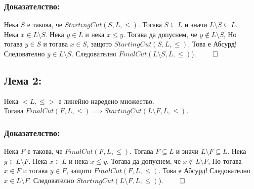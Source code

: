 \documentclass[12pt]{article}
\begin{document}
\subsubsection*{Доказателство:}
Нека \(S\) е такова, че \(StartingCut(S, L, \leq)\).
Тогава \(S \subseteq L\) и значи \(L \setminus S \subseteq L\).
Нека \(x \in L \setminus S\). Нека \(y \in L\) и нека \(x \leq y\).
Тогава да допуснем, че \(y \notin L \setminus S\),
Но тогава \(y \in S\) и тогава \(x \in S\), защото \(StartingCut(S, L, \leq)\).
Това е Абсурд! Следователно \(y \in L \setminus S\).
Следователно \(FinalCut(L \setminus S, L, \leq)\)). \(\qed\)

\subsection*{Лема 2:}
Нека \(<L, \leq>\) е линейно наредено множество.
\\
Тогава \(FinalCut(F, L, \leq) \implies StartingCut(L \setminus F, L, \leq)\).

\subsubsection*{Доказателство:}
Нека \(F\) е такова, че \(FinalCut(F, L, \leq)\).
Тогава \(F \subseteq L\) и значи \(L \setminus F \subseteq L\).
Нека \(y \in L \setminus F\). Нека \(x \in L\) и нека \(x \leq y\).
Тогава да допуснем, че \(x \notin L \setminus F\),
Но тогава \(x \in F\) и тогава \(y \in F\), защото \(FinalCut(F, L, \leq)\).
Това е Абсурд! Следователно \(x \in L \setminus F\).
Следователно \(StartingCut(L \setminus F, L, \leq)\)). \(\qed\)
\end{document}
